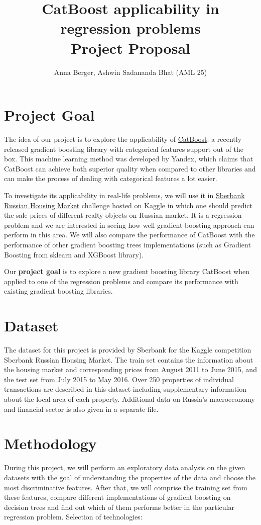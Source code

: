 \documentclass[11pt,a4paper]{article}
\title{\textbf{CatBoost applicability in regression problems} \\
	\Large{Project Proposal}}
\author{Anna Berger, Ashwin Sadananda Bhat (AML 25)}
\begin{document}
	\maketitle
	
	\section{Project Goal}
	The idea of our project is to explore the applicability of \href{https://github.com/catboost/catboost}{CatBoost}: a recently released gradient boosting library with categorical features support out of the box. This machine learning method was developed by Yandex, which claims that CatBoost can achieve both superior quality when compared to other libraries and can make the process of dealing with categorical features a lot easier.
	
	To investigate its applicability in real-life problems, we will use it in \href{https://www.kaggle.com/c/sberbank-russian-housing-market}{Sberbank Russian Housing Market} challenge hosted on Kaggle in which one should predict the sale prices of different realty objects on Russian market. It is a regression problem and we are interested in seeing how well gradient boosting approach can perform in this area. We will also compare the performance of CatBoost with the performance of other gradient boosting trees implementations (such as Gradient Boosting from sklearn and XGBoost library). 
	
	Our \textbf{project goal} is to explore a new gradient boosting library CatBoost when applied to one of the regression problems and compare its performance with existing gradient boosting libraries.
	
	\section{Dataset}
	The dataset for this project is provided by Sberbank for the Kaggle competition Sberbank Russian Housing Market. The train set contains the information about the housing market and corresponding prices from August 2011 to June 2015, and the test set from July 2015 to May 2016. Over 250 properties of individual transactions are described in this dataset including supplementary information about the local area of each property. Additional data on Russia's macroeconomy and financial sector is also given in a separate file.
	
	
	\section{Methodology}
	During this project, we will perform an exploratory data analysis on the given datasets with the goal of understanding the properties of the data and choose the most discriminative features. After that, we will comprise the training set from these features, compare different implementations of gradient boosting on decision trees and find out which of them performs better in the particular regression problem.
	Selection of technologies:
	
\end{document}
